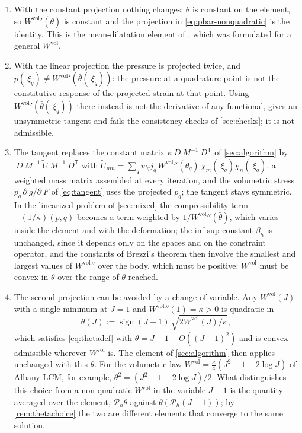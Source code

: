 \documentclass{article}
\newcommand{\F}{~F}
\newcommand{\transpose}[1]{#1^{\mathsf{T}}}
\newcommand{\supvol}{^{\mathrm{vol}}}
\theoremstyle{definition}
\theoremstyle{plain}
\begin{document}
\begin{enumerate}
\item With the constant projection nothing changes: $\bar\theta$ is
  constant on the element, so $W\supvol{}'(\bar\theta)$ is constant and the
  projection in \eqref{eq:pbar-nonquadratic} is the identity. This is the
  mean-dilatation element of \textcite{SimoTaylorPister:1985}, which was
  formulated for a general $W\supvol$.
\item With the linear projection the pressure is projected twice, and
  $\bar p(~\xi_q) \ne W\supvol{}'(\bar\theta(~\xi_q))$: the pressure at a
  quadrature point is not the constitutive response of the projected
  strain at that point. Using $W\supvol{}'(\bar\theta(~\xi_q))$ there
  instead is not the derivative of any functional, gives an unsymmetric
  tangent and fails the consistency checks of \cref{sec:checks}; it is
  not admissible.
\item The tangent replaces the constant matrix $\kappa ~D ~M^{-1}
  \transpose{~D}$ of \cref{sec:algorithm} by $~D ~M^{-1} \tilde{~U}
  ~M^{-1} \transpose{~D}$ with $\tilde U_{mn} = \sum_q w_q j_q\,
  W\supvol{}''(\bar\theta_q)\, \chi_m(~\xi_q) \chi_n(~\xi_q)$, a weighted
  mass matrix assembled at every iteration, and the volumetric stress
  $\bar p_q\,\partial ~g/\partial\F$ of \eqref{eq:tangent} uses the
  projected $\bar p_q$; the tangent stays symmetric. In the linearized
  problem of \cref{sec:mixed} the compressibility term $-(1/\kappa)(p,q)$
  becomes a term weighted by $1/W\supvol{}''(\bar\theta)$, which varies
  inside the element and with the deformation; the inf-sup constant
  $\beta_h$ is unchanged, since it depends only on the spaces and on the
  constraint operator, and the constants of Brezzi's theorem then involve
  the smallest and largest values of $W\supvol{}''$ over the body, which
  must be positive: $W\supvol$ must be convex in $\theta$ over the range of
  $\bar\theta$ reached.
\item The second projection can be avoided by a change of variable. Any
  $W\supvol(J)$ with a single minimum at $J = 1$ and $W\supvol{}''(1) =
  \kappa > 0$ is quadratic in
  \begin{equation}
    \label{eq:thetafromU}
    \theta(J) := \operatorname{sign}(J - 1)\, \sqrt{2 W\supvol(J)/\kappa} ,
  \end{equation}
  which satisfies \eqref{eq:thetadef} with $\theta = J - 1 + O((J-1)^2)$
  and is convex-admissible wherever $W\supvol$ is. The element of
  \cref{sec:algorithm} then applies unchanged with this $\theta$. For the
  volumetric law $W\supvol = \tfrac{\kappa}{4}(J^2 - 1 - 2\log J)$ of
  Albany-LCM, for example, $\theta^2 = (J^2 - 1 - 2\log J)/2$. What
  distinguishes this choice from a non-quadratic $W\supvol$ in the variable
  $J - 1$ is the quantity averaged over the element, $\mathcal{P}_h\theta$
  against $\theta(\mathcal{P}_h(J - 1))$; by \cref{rem:thetachoice}
  the two are different elements that converge to the same solution.
\end{enumerate}
\end{document}
